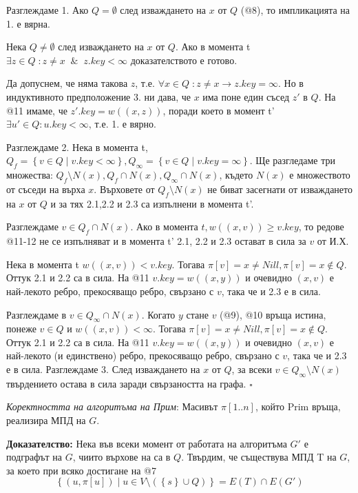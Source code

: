\documentclass{article}
\renewcommand{\\}{\newline}
\newcommand{\amp}{\;\&\;}
\newcommand{\sep}{\;|\;}
\newcommand{\doc}{\textbf{Доказателство: }}
\newcommand{\proven}{\hfill $\square$}
\begin{document}
Разглеждаме 1. Ако \(Q = \emptyset\) след изваждането на \(x\) от \(Q\) (@8), то импликацията на 1. е вярна.

Нека \(Q \not=\emptyset\) след изваждането на \(x\) от \(Q\). Ако в момента t \(\exists z \in Q\;:z \not=x \;\amp\; z.key < \infty\)  доказателството е готово.

Да допуснем, че няма такова \(z\), т.е. \(\forall x \in Q\;:z\not=x \rightarrow z.key = \infty\). Но в индуктивното предположение 3. ни дава, че \(x\) има поне един съсед \(z'\) в \(Q\). На @11 имаме, че \(z'.key = w((x, z))\), поради което в момент t' \(\exists u' \in Q: u.key < \infty\), т.е. 1. е вярно.   

Разглеждаме 2. Нека в момента t, \(Q_{f} = \left\{v \in Q \sep v.key < \infty\right\}, Q_{\infty} = \left\{v \in Q \sep v.key = \infty\right\}\). Ще разгледаме три множества: \(Q_{f}\setminus N(x), Q_{f}\cap N(x), Q_{\infty}\cap N(x)\), където \(N(x)\) е множеството от съседи на върха \(x\). Върховете от \(Q_{f}\setminus N(x)\) не биват засегнати от изваждането на \(x\) от \(Q\) и за тях 2.1,2.2 и 2.3 са изпълнени в момента t'.

Разглеждаме \(v \in Q_{f} \cap N(x)\). Ако в момента \(t, w((x, v)) \geq v.key\), то редове @11-12 не се изпълняват и в момента t' 2.1, 2.2 и 2.3  остават в сила за \(v\) от И.Х. 

Нека в момента t \(w((x, v)) < v.key\).  Тогава \(\pi[v] = x \not= Nill, \pi[v] = x \not\in Q\). Оттук 2.1 и 2.2 са в сила. На @11 \(v.key = w((x, y))\) и очевидно \((x, v)\)  е най-лекото ребро, прекосяващо ребро, свързано с \(v\), така че и 2.3 е в сила.    

Разглеждаме в \(v \in Q_{\infty} \cap N(x)\). Когато \(y\) стане \(v\) (@9), @10 връща истина, понеже \(v \in Q\) и \(w((x, v)) < \infty\). Тогава \(\pi[v] = x \not= Nill, \pi[v] = x \not\in Q\). Оттук 2.1 и 2.2 са в сила. На @11 \(v.key = w((x, y))\) и очевидно \((x, v)\)  е най-лекото (и единствено) ребро, прекосяващо ребро, свързано с \(v\), така че и 2.3 е в сила.    
Разглеждаме 3. След изваждането на \(x\) от \(Q\), за всеки \(v \in Q_{\infty}\setminus N(x)\) твърдението остава в сила заради свързаността на графа.   \proven

\textit{Коректността на алгоритъма на Прим}: Масивът \(\pi[1..n]\), който Prim връща, реализира МПД на \(G\). 

\doc Нека във всеки момент от работата на алгоритъма \(G'\) е подграфът на \(G\), чиито върхове на са в \(Q\). Твърдим, че съществува МПД T на \(G\), за което при всяко достигане на @7 \[
  \left\{(u, \pi[u]) \sep u \in V \setminus (\left\{s\right\} \cup Q)\right\} = E(T) \cap E(G')
\]    
\end{document}
